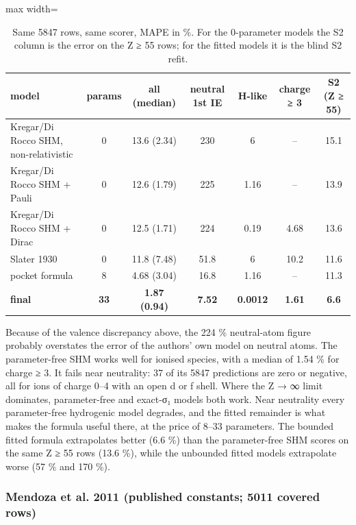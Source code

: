 \documentclass[aps,pra,preprint,notitlepage,superscriptaddress,amsmath,amssymb]{revtex4-2}
\begin{document}
\begin{table}[htbp]
\caption{Same 5847 rows, same scorer, MAPE in \%. For the 0-parameter models the S2 column is the error on the Z ≥ 55 rows; for the fitted models it is the blind S2 refit.}
\footnotesize\linespread{1}\selectfont\setlength{\tabcolsep}{5pt}\renewcommand{\arraystretch}{1.1}
\begin{adjustbox}{max width=\linewidth}
\begin{tabular}{lcccccc}
\hline\hline
model & params & all (median) & neutral 1st IE & H-like & charge ≥ 3 & S2 (Z ≥ 55) \\
\hline
Kregar/Di Rocco SHM, non-relativistic & 0 & 13.6 (2.34) & 230 & 6 & – & 15.1 \\
Kregar/Di Rocco SHM + Pauli & 0 & 12.6 (1.79) & 225 & 1.16 & – & 13.9 \\
Kregar/Di Rocco SHM + Dirac & 0 & 12.5 (1.71) & 224 & 0.19 & 4.68 & 13.6 \\
Slater 1930 & 0 & 11.8 (7.48) & 51.8 & 6 & 10.2 & 11.6 \\
pocket formula & 8 & 4.68 (3.04) & 16.8 & 1.16 & – & 11.3 \\
\textbf{final} & \textbf{33} & \textbf{1.87 (0.94)} & \textbf{7.52} & \textbf{0.0012} & \textbf{1.61} & \textbf{6.6} \\
\hline\hline
\end{tabular}
\end{adjustbox}
\end{table}


Because of the valence discrepancy above, the 224 \% neutral-atom figure probably overstates the error of the authors' own model on neutral atoms. The parameter-free SHM works well for ionised species, with a median of 1.54 \% for charge ≥ 3. It fails near neutrality: 37 of its 5847 predictions are zero or negative, all for ions of charge 0–4 with an open d or f shell. Where the Z → ∞ limit dominates, parameter-free and exact-σ₁ models both work. Near neutrality every parameter-free hydrogenic model degrades, and the fitted remainder is what makes the formula useful there, at the price of 8–33 parameters. The bounded fitted formula extrapolates better (6.6 \%) than the parameter-free SHM scores on the same Z ≥ 55 rows (13.6 \%), while the unbounded fitted models extrapolate worse (57 \% and 170 \%).


\subsubsection{Mendoza et al. 2011 (published constants; 5011 covered rows)}
\end{document}
